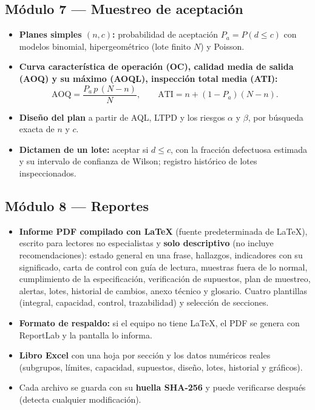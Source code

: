 \documentclass[11pt,a4paper]{article}
\begin{document}
\subsection{Módulo 7 — Muestreo de aceptación}
\begin{itemize}
\item \textbf{Planes simples $(n,c)$:} probabilidad de aceptación
  $P_a=P(d\le c)$ con modelos binomial, hipergeométrico (lote finito $N$) y Poisson.
\item \textbf{Curva característica de operación (OC), calidad media de salida (AOQ) y su máximo
  (AOQL), inspección total media (ATI):}
  \[
  \text{AOQ}=\frac{P_a\,p\,(N-n)}{N},\qquad
  \text{ATI}=n+(1-P_a)(N-n).
  \]
\item \textbf{Diseño del plan} a partir de AQL, LTPD y los riesgos $\alpha$ y $\beta$, por
  búsqueda exacta de $n$ y $c$.
\item \textbf{Dictamen de un lote:} aceptar si $d\le c$, con la fracción defectuosa estimada y su
  intervalo de confianza de Wilson; registro histórico de lotes inspeccionados.
\end{itemize}

\subsection{Módulo 8 — Reportes}
\begin{itemize}
\item \textbf{Informe PDF compilado con LaTeX} (fuente predeterminada de LaTeX), escrito para
  lectores no especialistas y \textbf{solo descriptivo} (no incluye recomendaciones): estado
  general en una frase, hallazgos, indicadores con su significado, carta de control con guía de
  lectura, muestras fuera de lo normal, cumplimiento de la especificación, verificación de
  supuestos, plan de muestreo, alertas, lotes, historial de cambios, anexo técnico y glosario.
  Cuatro plantillas (integral, capacidad, control, trazabilidad) y selección de secciones.
\item \textbf{Formato de respaldo:} si el equipo no tiene LaTeX, el PDF se genera con ReportLab
  y la pantalla lo informa.
\item \textbf{Libro Excel} con una hoja por sección y los datos numéricos reales (subgrupos,
  límites, capacidad, supuestos, diseño, lotes, historial y gráficos).
\item Cada archivo se guarda con su \textbf{huella SHA-256} y puede verificarse después (detecta
  cualquier modificación).
\end{itemize}
\end{document}
